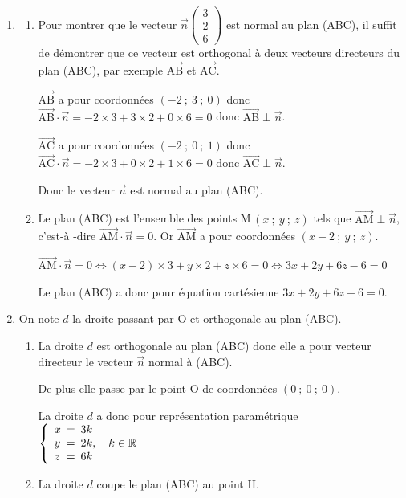 \documentclass[10pt]{article}
\providecommand{\R}{\mathbb{R}}
\providecommand{\vect}[1]{\overrightarrow{#1}}
\providecommand{\vectt}[1]{\overrightarrow{\mathrm{#1}}}
\begin{document}
\begin{enumerate}
\item 
	\begin{enumerate}
		\item Pour montrer que le vecteur $\vect{n}\begin{pmatrix}3\\2\\6\end{pmatrix}$ est normal au plan (ABC), il suffit de démontrer que ce vecteur est orthogonal à  deux vecteurs directeurs du plan (ABC),  par exemple $\vectt{AB}$ et $\vectt{AC}$.
		
$\vectt{AB}$ a pour coordonnées $(-2~;~3~;~0)$ donc $\vectt{AB}\cdot \vect{n}=-2\times 3 + 3\times 2 + 0\times 6 = 0$ donc $\vectt{AB}\perp \vect{n}$.		

$\vectt{AC}$ a pour coordonnées $(-2~;~0~;~1)$ donc $\vectt{AC}\cdot \vect{n}=-2\times 3 + 0\times 2 + 1\times 6 = 0$ donc $\vectt{AC}\perp \vect{n}$.		
		
Donc le vecteur $\vect{n}$ est normal au plan (ABC).
		
		\item 
Le plan (ABC) est l'ensemble des points M\,$(x~;~y~;~z)$ tels que $\vectt{AM}\perp \vect{n}$, c'est-à -dire $\vectt{AM}\cdot \vect{n}=0$.
Or $\vectt{AM}$ a pour coordonnées $(x-2~;~y~;~z)$.

$\vectt{AM}\cdot \vect{n}=0 \iff (x-2)\times 3 + y\times 2 + z\times 6=0 \iff 3x +2y +6z -6=0$

Le plan (ABC) a donc pour équation cartésienne $3x + 2y + 6z - 6 = 0$.
	\end{enumerate}

\item  On note $d$ la droite passant par O et orthogonale au plan (ABC). 
	\begin{enumerate}
		\item
La droite $d$ est orthogonale au plan (ABC) donc elle a pour vecteur directeur le vecteur $\vect{n}$ normal à  (ABC).

De plus elle passe par le point O de coordonnées $(0~;~0~;~0)$.

La droite $d$ a donc pour représentation paramétrique
$\left \lbrace
\begin{array}{l !{=} l}
x & 3k\\
y & 2k,\quad k\in\R\\
z & 6k
\end{array}
\right .$

		\item La droite $d$ coupe le plan (ABC) au point H.
		

\end{enumerate}
\end{enumerate}
\end{document}
